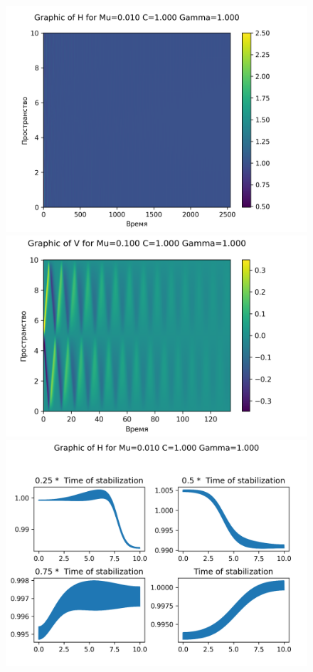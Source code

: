 \begin{figure}[H]
	\centering
	\includegraphics[scale=0.5]{../graphs_data_nonsmooth_2/value/Graph_H_mu0.010_C1.000_gamma1.000.png}
	\includegraphics[scale=0.5]{../graphs_data_nonsmooth_2/value/Graph_V_mu0.010_C1.000_gamma1.000.png}	
	\includegraphics[scale=0.5]{../graphs_data_nonsmooth_2/slices/Graph_H_mu0.010_C1.000_gamma1.000.png}

\end{figure}
